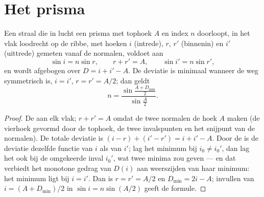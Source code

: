 \section{Het prisma}

\begin{proposition}[Prismaformules]\label{prop:b1:rays-reflection-refraction:prism}
Een straal die in lucht een prisma met tophoek $A$ en index $n$ doorloopt, in
het vlak loodrecht op de ribbe, met hoeken $i$ (intrede), $r$, $r'$
(binnenin) en $i'$ (uittrede) gemeten vanaf de normalen, voldoet aan
\[
\sin i = n \sin r, \qquad r + r' = A, \qquad \sin i' = n \sin r',
\]
en wordt afgebogen over $D = i + i' - A$. De deviatie is minimaal wanneer de
weg symmetrisch is, $i = i'$, $r = r' = A/2$; dan geldt
\[
n = \frac{\sin\frac{A + D_{\min}}{2}}{\sin\frac{A}{2}} .
\]
\end{proposition}

\begin{proof}
De  aan elk vlak; $r + r' = A$ omdat de twee normalen de
hoek $A$ maken (de vierhoek gevormd door de tophoek, de twee invalspunten en
het snijpunt van de normalen). De totale deviatie is
$(i - r) + (i' - r') = i + i' - A$. Door de  is
de deviatie dezelfde functie van $i$ als van $i'$; lag het minimum bij
$i_0 \neq i_0'$, dan lag het ook bij de omgekeerde inval $i_0'$, wat twee
minima zou geven --- en dat verbiedt het monotone gedrag van $D(i)$ aan
weerszijden van haar minimum: het minimum ligt bij $i = i'$.
Dan is $r = r' = A/2$ en $D_{\min} = 2i - A$; invullen van $i = (A +
D_{\min})/2$ in $\sin i = n\sin(A/2)$ geeft de formule.
\end{proof}

